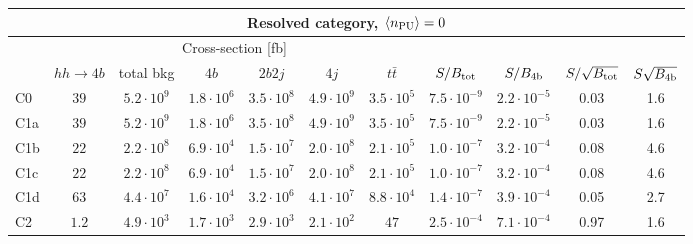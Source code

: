 \begin{tabular}{|l|cc|cccc|cccc|}
  \hline
\multicolumn{11}{|c|}{Resolved category, $\left\langle n_{\rm PU}\right\rangle=0$}\\
\hline
&  \multicolumn{6}{c|}{Cross-section [fb]} &  &  & &  \\
   &  $hh\to 4b$ &  total bkg  &   $4b$    &  $2b2j$   &   $4j$    &
$t\bar{t}$ &
$S/B_{\rm tot}$ & $S/B_{\rm 4b}$ & $S/\sqrt{B_{\rm tot}}$ & $S\sqrt{B_{\rm 4b}}$ \\
  \hline
  \hline
 C0    & $39$  &   $5.2\cdot 10^9$   & $1.8\cdot 10^6$ & $3.5\cdot 10^8$ & $4.9\cdot 10^9$ & $3.5\cdot 10^5$  & $7.5\cdot 10^{-9}$   &  $2.2\cdot 10^{-5}$  &   0.03   & 1.6        \\
 C1a   & $39$  &   $5.2\cdot 10^9$   & $1.8\cdot 10^6$ & $3.5\cdot 10^8$ & $4.9\cdot 10^9$ & $3.5\cdot 10^5$ &  $7.5\cdot 10^{-9}$   & $2.2\cdot 10^{-5}$   &     0.03   & 1.6       \\
 C1b   & $22$  &   $2.2\cdot 10^8$   & $6.9\cdot 10^4$ & $1.5\cdot 10^7$ & $2.0\cdot 10^8$ & $2.1\cdot 10^5$ &  $1.0\cdot 10^{-7}$  &  $3.2\cdot 10^{-4}$  &  0.08   & 4.6         \\
 C1c   & $22$  &   $2.2\cdot 10^8$   & $6.9\cdot 10^4$ & $1.5\cdot 10^7$ & $2.0\cdot 10^8$ & $2.1\cdot 10^5$ &  $1.0\cdot 10^{-7}$  & $3.2\cdot 10^{-4}$   &  0.08   & 4.6         \\
 C1d   & $63$  &   $4.4\cdot 10^7$   & $1.6\cdot 10^4$ & $3.2\cdot 10^6$ & $4.1\cdot 10^7$ & $8.8\cdot 10^4$ &   $1.4\cdot 10^{-7}$  &  $3.9\cdot 10^{-4}$   &   0.05   & 2.7         \\
 C2    & $1.2$  &   $4.9\cdot 10^3$   & $1.7\cdot 10^3$ & $2.9\cdot 10^3$ & $2.1\cdot 10^2$ & $47$ &            $ 2.5\cdot 10^{-4}$   & $7.1\cdot 10^{-4}$   &   0.97   & 1.6       \\
\hline
\end{tabular}
